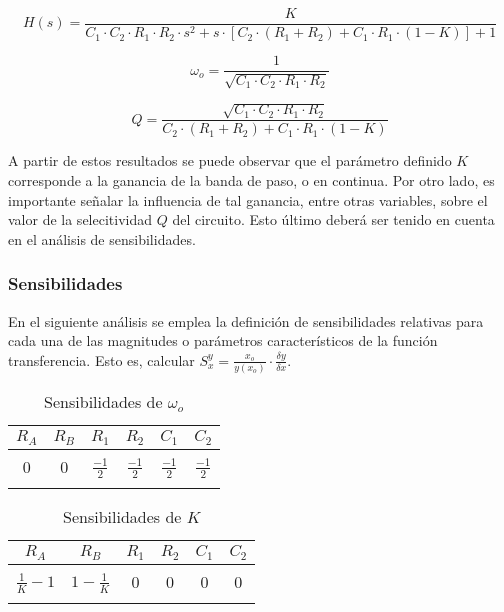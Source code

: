 \begin{equation}
    H(s) = \frac{K}{C_1 \cdot C_2 \cdot R_1 \cdot R_2 \cdot s^{2} + s \cdot \left[ C_2 \cdot (R_1 + R_2) + C_1 \cdot R_1 \cdot (1 - K) \right] + 1}
    \label{eq:sallen_key_h}
\end{equation}

\begin{equation}
    \omega_o = \frac{1}{\sqrt{C_1 \cdot C_2 \cdot R_1 \cdot R_2}}
    \label{eq:sallen_key_wo}
\end{equation}

\begin{equation}
    Q = \frac{\sqrt{C_1 \cdot C_2 \cdot R_1 \cdot R_2}}{C_2 \cdot (R_1 + R_2) + C_1 \cdot R_1 \cdot (1 - K)}
    \label{eq:sallen_key_q}
\end{equation}

A partir de estos resultados se puede observar que el par\'ametro definido $K$ corresponde a la ganancia de la banda de paso, o en continua. Por otro lado, es importante
se\~nalar la influencia de tal ganancia, entre otras variables, sobre el valor de la selecitividad $Q$ del circuito. Esto \'ultimo deber\'a ser tenido en cuenta en el an\'alisis de sensibilidades.

\subsubsection{Sensibilidades}
En el siguiente an\'alisis se emplea la definici\'on de sensibilidades relativas para cada una de las magnitudes o par\'ametros caracter\'isticos de la funci\'on transferencia. Esto es,
calcular $S^{y}_x = \frac{x_o}{y(x_o)} \cdot \frac{\delta y}{\delta x}$.

\begin{table}[H]
    \centering
    \begin{tabular}{c c c c c c}
        $R_A$ & $R_B$ & $R_1$ & $R_2$ & $C_1$ & $C_2$ \\
        \hline \\
        $0$ & $0$ & $\frac{-1}{2}$ & $\frac{-1}{2}$ & $\frac{-1}{2}$ & $\frac{-1}{2}$ \\
        \\
        \hline
    \end{tabular}
    \caption{Sensibilidades de $\omega_o$}
\end{table}

\begin{table}[H]
    \centering
    \begin{tabular}{c c c c c c}
        $R_A$ & $R_B$ & $R_1$ & $R_2$ & $C_1$ & $C_2$ \\
        \hline \\
        $\frac{1}{K} - 1$ & $1 - \frac{1}{K}$ & $0$ & $0$ & $0$ & $0$ \\
        \\
        \hline
    \end{tabular}
    \caption{Sensibilidades de $K$}
\end{table}


